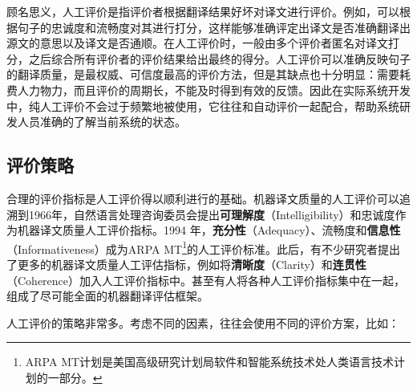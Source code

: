 \parinterval 顾名思义，人工评价是指评价者根据翻译结果好坏对译文进行评价。例如，可以根据句子的忠诚度和流畅度对其进行打分，这样能够准确评定出译文是否准确翻译出源文的意思以及译文是否通顺。在人工评价时，一般由多个评价者匿名对译文打分，之后综合所有评价者的评价结果给出最终的得分。人工评价可以准确反映句子的翻译质量，是最权威、可信度最高的评价方法，但是其缺点也十分明显：需要耗费人力物力，而且评价的周期长，不能及时得到有效的反馈。因此在实际系统开发中，纯人工评价不会过于频繁地被使用，它往往和自动评价一起配合，帮助系统研发人员准确的了解当前系统的状态。


\subsection{评价策略}

\parinterval 合理的评价指标是人工评价得以顺利进行的基础。机器译文质量的人工评价可以追溯到1966年，自然语言处理咨询委员会提出{\small\sffamily\bfseries{可理解度}}（Intelligibility）和忠诚度作为机器译文质量人工评价指标。1994 年，{\small\sffamily\bfseries{充分性}}（Adequacy）、流畅度和{\small\sffamily\bfseries{信息性}}（Informativeness）成为ARPA MT\footnote{ARPA MT计划是美国高级研究计划局软件和智能系统技术处人类语言技术计划的一部分。}的人工评价标准。此后，有不少研究者提出了更多的机器译文质量人工评估指标，例如将{\small\sffamily\bfseries{清晰度}}（Clarity）和{\small\sffamily\bfseries{连贯性}}（Coherence）加入人工评价指标中。甚至有人将各种人工评价指标集中在一起，组成了尽可能全面的机器翻译评估框架。

\parinterval 人工评价的策略非常多。考虑不同的因素，往往会使用不同的评价方案，比如：

